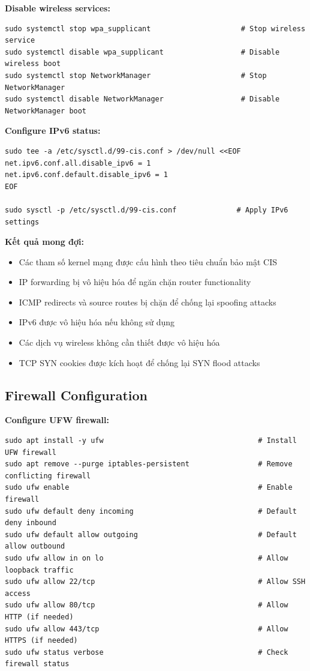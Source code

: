 \noindent \textbf{Disable wireless services:}
\begin{verbatim}
sudo systemctl stop wpa_supplicant                     # Stop wireless service
sudo systemctl disable wpa_supplicant                  # Disable wireless boot
sudo systemctl stop NetworkManager                     # Stop NetworkManager
sudo systemctl disable NetworkManager                  # Disable NetworkManager boot
\end{verbatim}

\noindent \textbf{Configure IPv6 status:}
\begin{verbatim}
sudo tee -a /etc/sysctl.d/99-cis.conf > /dev/null <<EOF
net.ipv6.conf.all.disable_ipv6 = 1
net.ipv6.conf.default.disable_ipv6 = 1
EOF

sudo sysctl -p /etc/sysctl.d/99-cis.conf              # Apply IPv6 settings
\end{verbatim}

\noindent \textbf{Kết quả mong đợi:}
\begin{itemize}
\item Các tham số kernel mạng được cấu hình theo tiêu chuẩn bảo mật CIS
\item IP forwarding bị vô hiệu hóa để ngăn chặn router functionality
\item ICMP redirects và source routes bị chặn để chống lại spoofing attacks
\item IPv6 được vô hiệu hóa nếu không sử dụng
\item Các dịch vụ wireless không cần thiết được vô hiệu hóa
\item TCP SYN cookies được kích hoạt để chống lại SYN flood attacks
\end{itemize}

\subsection{Firewall Configuration}

\noindent \textbf{Configure UFW firewall:}
\begin{verbatim}
sudo apt install -y ufw                                    # Install UFW firewall
sudo apt remove --purge iptables-persistent                # Remove conflicting firewall
sudo ufw enable                                            # Enable firewall
sudo ufw default deny incoming                             # Default deny inbound
sudo ufw default allow outgoing                            # Default allow outbound
sudo ufw allow in on lo                                    # Allow loopback traffic
sudo ufw allow 22/tcp                                      # Allow SSH access
sudo ufw allow 80/tcp                                      # Allow HTTP (if needed)
sudo ufw allow 443/tcp                                     # Allow HTTPS (if needed)
sudo ufw status verbose                                    # Check firewall status
\end{verbatim}

